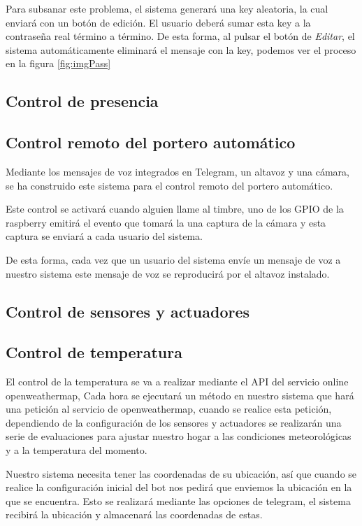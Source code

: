 \documentclass[10pt,journal,compsoc]{IEEEtran}
\begin{document}
Para subsanar este problema, el sistema generará una key aleatoria, la cual enviará con un botón de edición. El usuario deberá sumar esta key a la contraseña real término a término.
De esta forma, al pulsar el botón de \textit{Editar}, el sistema automáticamente eliminará el mensaje con la key, podemos ver el proceso en la figura \ref{fig:imgPass}

\subsection{Control de presencia}

\subsection{Control remoto del portero automático}
Mediante los mensajes de voz integrados en Telegram, un altavoz y una cámara, se  
ha construido este sistema para el control remoto del portero automático. 

Este control se activará cuando alguien llame al timbre, uno de los GPIO de la 
raspberry emitirá el evento que tomará la una captura de la cámara y esta 
captura se enviará a cada usuario del sistema. 

De esta forma, cada vez que un usuario del sistema envíe un mensaje de voz a 
nuestro sistema este mensaje de voz se reproducirá por el altavoz instalado.

\subsection{Control de sensores y actuadores}

\subsection{Control de temperatura}
El control de la temperatura se va a realizar mediante el API del servicio online openweathermap, 
Cada hora se ejecutará un método en nuestro sistema que hará una petición al 
servicio de openweathermap, cuando se realice esta petición, dependiendo de la 
configuración de los sensores y actuadores se realizarán una serie de 
evaluaciones para ajustar nuestro hogar a las condiciones meteorológicas y a la 
temperatura del momento.

Nuestro sistema necesita tener las coordenadas de su ubicación, así que cuando 
se realice la configuración inicial del bot nos pedirá que enviemos la ubicación 
en la que se encuentra. Esto se realizará mediante las opciones de telegram, el 
sistema recibirá la ubicación y almacenará las coordenadas de estas.
\end{document}
